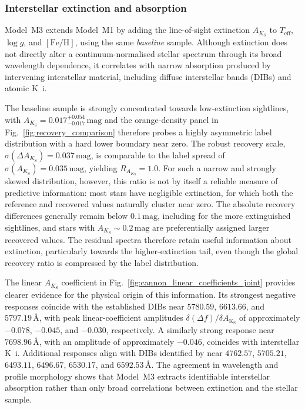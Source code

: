 \documentclass[twocolumn,apj,numberedappendix,appendixfloats]{openjournal}
\begin{document}
\subsubsection{Interstellar extinction and absorption}
\label{sec:analysis_cannon_extinction_labels}

Model~\textcolor{M3}{M3} extends Model~\textcolor{M1}{M1} by adding the line-of-sight extinction $A_{K_\mathrm{S}}$ to $T_\mathrm{eff}$, $\log g$, and $[\mathrm{Fe/H}]$, using the same \textit{baseline} sample. Although extinction does not directly alter a continuum-normalised stellar spectrum through its broad wavelength dependence, it correlates with narrow absorption produced by intervening interstellar material, including diffuse interstellar bands (DIBs) and atomic K~{\sc i}.

The baseline sample is strongly concentrated towards low-extinction sightlines, with $A_{K_\mathrm{S}} = 0.017_{-0.017}^{+0.054}\,\mathrm{mag}$ and the orange-density panel in Fig.~\ref{fig:recovery_comparison} therefore probes a highly asymmetric label distribution with a hard lower boundary near zero. 
The robust recovery scale, $\sigma(\Delta A_{K_\mathrm{S}})=0.037\,\mathrm{mag}$, is comparable to the label spread of $\sigma(A_{K_\mathrm{S}})=0.035\,\mathrm{mag}$, yielding $R_{A_{K_\mathrm{S}}}=1.0$. For such a narrow and strongly skewed distribution, however, this ratio is not by itself a reliable measure of predictive information: most stars have negligible extinction, for which both the reference and recovered values naturally cluster near zero. The absolute recovery differences generally remain below $0.1\,\mathrm{mag}$, including for the more extinguished sightlines, and stars with $A_{K_\mathrm{S}}\sim0.2\,\mathrm{mag}$ are preferentially assigned larger recovered values. The residual spectra therefore retain useful information about extinction, particularly towards the higher-extinction tail, even though the global recovery ratio is compressed by the label distribution.

The linear $A_{K_\mathrm{S}}$ coefficient in Fig.~\ref{fig:cannon_linear_coefficients_joint} provides clearer evidence for the physical origin of this information. Its strongest negative responses coincide with the established DIBs near $5780.59$, $6613.66$, and $5797.19\,\text{\AA}$, with peak linear-coefficient amplitudes $\delta (\Delta f) / \delta A_\mathrm{K_S}$ of approximately $-0.078$, $-0.045$, and $-0.030$, respectively. A similarly strong response near $7698.96\,\text{\AA}$, with an amplitude of approximately $-0.046$, coincides with interstellar K~{\sc i}. Additional responses align with DIBs identified by \citet{Vogrincic2023} near $4762.57$, $5705.21$, $6493.11$, $6496.67$, $6530.17$, and $6592.53\,\text{\AA}$. The agreement in wavelength and profile morphology shows that Model~\textcolor{M3}{M3} extracts identifiable interstellar absorption rather than only broad correlations between extinction and the stellar sample.
\end{document}
